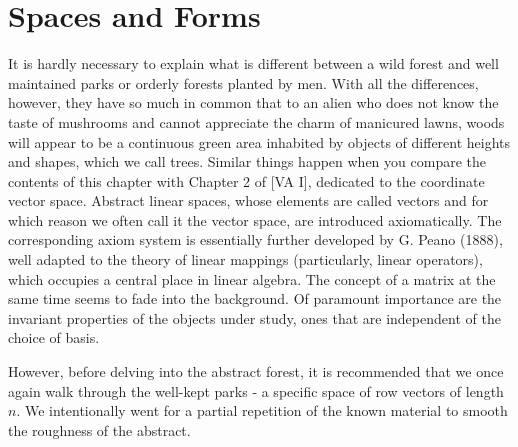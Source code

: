 \chapter{Spaces and Forms}
It is hardly necessary to explain what is different between a wild forest and well maintained parks or orderly forests planted by men. With all the differences, however, they have so much in common that to an alien who does not know the taste of mushrooms and cannot appreciate the charm of manicured lawns, woods will appear to be a continuous green area inhabited by objects of different heights and shapes, which we call trees. Similar things happen when you compare the contents of this chapter with Chapter 2 of [VA I], dedicated to the coordinate vector space. Abstract linear spaces, whose elements are called vectors and for which reason we often call it the vector space, are introduced axiomatically. The corresponding axiom system is essentially further developed by G. Peano (1888), well adapted to the theory of linear mappings (particularly, linear operators), which occupies a central place in linear algebra. The concept of a matrix at the same time seems to fade into the background. Of paramount importance are the invariant properties of the objects under study, ones that are independent of the choice of basis. 

However, before delving into the abstract forest, it is recommended that we once again walk through the well-kept parks - a specific space of row vectors of length $n$. We intentionally went for a partial repetition of the known material to smooth the roughness of the abstract.



